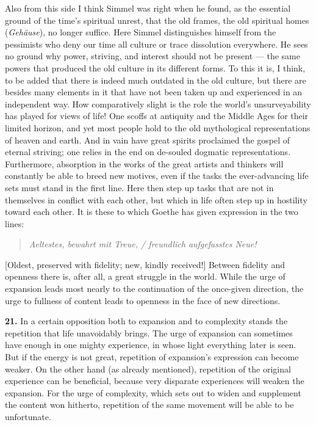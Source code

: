 \documentclass[12pt]{book}
\newcommand{\hnum}[1]{\textbf{#1.}\enspace}
\newcommand{\opage}[1]{\marginnote{\footnotesize\textit{[#1]}}}
\begin{document}
Also from this side I think Simmel was right when he found, as the essential ground of the time's spiritual
unrest, that the old frames, the old spiritual homes (\textit{Gehäuse}), no longer suffice. Here Simmel
distinguishes himself from the pessimists who deny our time all culture or trace dissolution everywhere. He
sees no ground why power, striving, and interest should not be present --- the same powers that produced the
old \opage{64}culture in its different forms. To this it is, I think, to be added that there is indeed much outdated in
the old culture, but there are besides many elements in it that have not been taken up and experienced in an
independent way. How comparatively slight is the role the world's unsurveyability has played for views of
life! One scoffs at antiquity and the Middle Ages for their limited horizon, and yet most people hold to the
old mythological representations of heaven and earth. And in vain have great spirits proclaimed the gospel of
eternal striving; one relies in the end on de-souled dogmatic representations. Furthermore, absorption in the
works of the great artists and thinkers will constantly be able to breed new motives, even if the tasks the
ever-advancing life sets must stand in the first line. Here then step up tasks that are not in themselves in
conflict with each other, but which in life often step up in hostility toward each other. It is these to
which Goethe has given expression in the two lines:

\begin{quote}
\textit{Aeltestes, bewahrt mit Treue, / freundlich aufgefasstes Neue!}
\end{quote}

[Oldest, preserved with fidelity; new, kindly received!] Between fidelity and openness there is, after all, a
great struggle in the world. While the urge of expansion leads most nearly to the continuation of the once-given
direction, the urge to fullness of content leads to openness in the face of new directions.

\hnum{21} In a certain opposition both to expansion and to complexity stands the repetition that life
unavoidably brings. The urge of expansion can sometimes have enough in one mighty experience, in whose light
everything later is seen. But if the energy is not great, repetition of expansion's expression can become
weaker. On the other hand (as already mentioned), repetition of the original experience can be beneficial,
because very disparate experiences will weaken the expansion. \opage{65}For the urge of complexity, which sets out to
widen and supplement the content won hitherto, repetition of the same movement will be able to be unfortunate.
\end{document}
